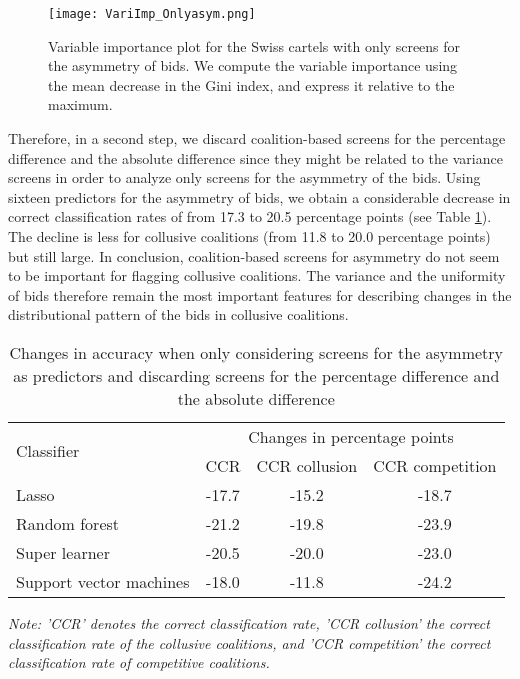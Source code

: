 \documentclass[a4paper,11pt]{article}
\begin{document}
	\begin{figure}[!htp]
		\centering \caption{\label{VariImp_Onlyasym} Variable importance plot for the Swiss cartels with only screens for the asymmetry of bids. We compute the variable importance using the mean decrease in the Gini index, and express it relative to the maximum.}
		\texttt{[image: VariImp\_Onlyasym.png]}
	\end{figure}
	
	Therefore, in a second step, we discard coalition-based screens for the percentage difference and the absolute difference since they might be related to the variance screens in order to analyze only screens for the asymmetry of the bids. Using sixteen predictors for the asymmetry of bids, we obtain a considerable decrease in correct classification rates of from 17.3 to 20.5 percentage points (see Table \ref{CCRonlyasym_discPercAbsol}). The decline is less for collusive coalitions (from 11.8 to 20.0 percentage points) but still large. In conclusion, coalition-based screens for asymmetry do not seem to be important for flagging collusive coalitions. The variance and the uniformity of bids therefore remain the most important features for describing changes in the distributional pattern of the bids in collusive coalitions.
	
	
	\begin{table}[ht]
		\caption{Changes in accuracy when only considering screens for the asymmetry as predictors and discarding screens for the percentage difference and the absolute difference }\label{CCRonlyasym_discPercAbsol}
		\begin{center}
			\begin{tabular}{lccc}
				\hline
				\multirow{2}{*}{Classifier} & \multicolumn{3}{c}{Changes in percentage points}               \\ \cline{2-4} 
				& CCR  & CCR collusion  & CCR competition \\ \hline
				Lasso                       & -17.7   & -15.2             & -18.7                \\
				Random   forest             & -21.2   & -19.8             & -23.9               \\
				Super learner               & -20.5   & -20.0             & -23.0              \\
				Support   vector machines   & -18.0   & -11.8             & -24.2              \\ \hline
			\end{tabular}
		\end{center}
		\par
		\textit{Note: 'CCR' denotes the correct classification rate, 'CCR collusion' the correct classification rate of the collusive coalitions, and 'CCR competition' the correct classification rate of competitive coalitions.}
	\end{table}
	
\end{document}
